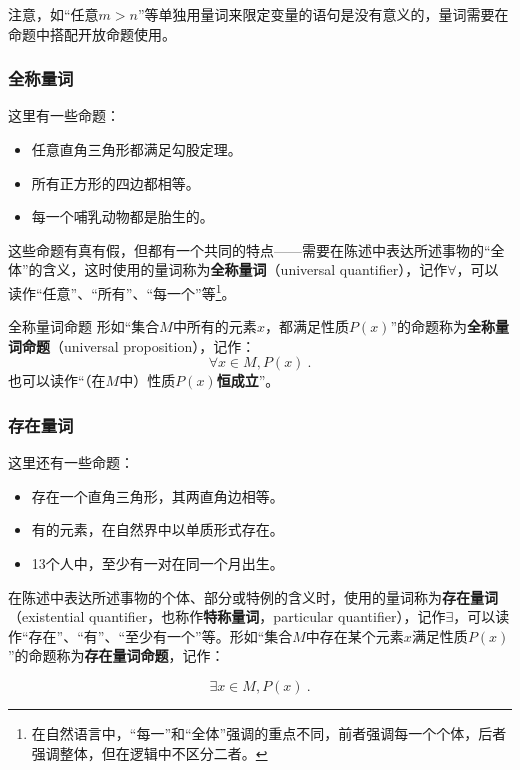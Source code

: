 注意，如“任意$m>n$”等单独用量词来限定变量的语句是没有意义的，量词需要在命题中搭配开放命题使用。

\subsubsection{全称量词}

这里有一些命题：
\begin{itemize}
\item 任意直角三角形都满足勾股定理。
\item 所有正方形的四边都相等。
\item 每一个哺乳动物都是胎生的。
\end{itemize}

这些命题有真有假，但都有一个共同的特点——需要在陈述中表达所述事物的“全体”的含义，这时使用的量词称为\textbf{全称量词}（universal quantifier），记作$\forall$，可以读作“任意”、“所有”、“每一个”等\footnote{在自然语言中，“每一”和“全体”强调的重点不同，前者强调每一个个体，后者强调整体，但在逻辑中不区分二者。}。

\begin{definition}{全称量词命题}
形如“集合$M$中所有的元素$x$，都满足性质$P(x)$”的命题称为\textbf{全称量词命题}（universal proposition），记作：
\begin{equation}
\forall x\in M,P(x)~.
\end{equation}
也可以读作“（在$M$中）性质$P(x)$\textbf{恒成立}”。
\end{definition}

\subsubsection{存在量词}

这里还有一些命题：
\begin{itemize}
\item 存在一个直角三角形，其两直角边相等。
\item 有的元素，在自然界中以单质形式存在。
\item 13个人中，至少有一对在同一个月出生。
\end{itemize}
在陈述中表达所述事物的个体、部分或特例的含义时，使用的量词称为\textbf{存在量词}（existential quantifier，也称作\textbf{特称量词}，particular quantifier），记作$\exists$，可以读作“存在”、“有”、“至少有一个”等。形如“集合$M$中存在某个元素$x$满足性质$P(x)$”的命题称为\textbf{存在量词命题}，记作：

\begin{equation}
\exists x\in M,P(x)~.
\end{equation}
